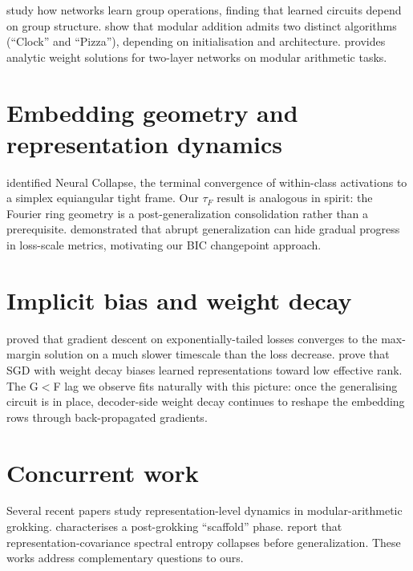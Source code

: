 \documentclass[12pt,openany,a4paper]{book}
\newcommand{\tauf}{\tau_{F}}
\begin{document}
\citet{chughtai2023toy} study how networks learn group operations, finding that learned circuits depend on group structure. \citet{zhong2023clock} show that modular addition admits two distinct algorithms (``Clock'' and ``Pizza''), depending on initialisation and architecture. \citet{gromov2023grokking} provides analytic weight solutions for two-layer networks on modular arithmetic tasks.

\section{Embedding geometry and representation dynamics}

\citet{papyan2020prevalence} identified Neural Collapse, the terminal convergence of within-class activations to a simplex equiangular tight frame. Our $\tauf$ result is analogous in spirit: the Fourier ring geometry is a post-generalization consolidation rather than a prerequisite. \citet{barak2022hidden} demonstrated that abrupt generalization can hide gradual progress in loss-scale metrics, motivating our BIC changepoint approach.

\section{Implicit bias and weight decay}

\citet{soudry2018implicit} proved that gradient descent on exponentially-tailed losses converges to the max-margin solution on a much slower timescale than the loss decrease. \citet{galanti2024sgd} prove that SGD with weight decay biases learned representations toward low effective rank. The G$<$F lag we observe fits naturally with this picture: once the generalising circuit is in place, decoder-side weight decay continues to reshape the embedding rows through back-propagated gradients.

\section{Concurrent work}

Several recent papers study representation-level dynamics in modular-arithmetic grokking. \citet{khaliq2026scaffold} characterises a post-grokking ``scaffold'' phase. \citet{truong2026spectral} report that representation-covariance spectral entropy collapses before generalization. These works address complementary questions to ours.


\end{document}
